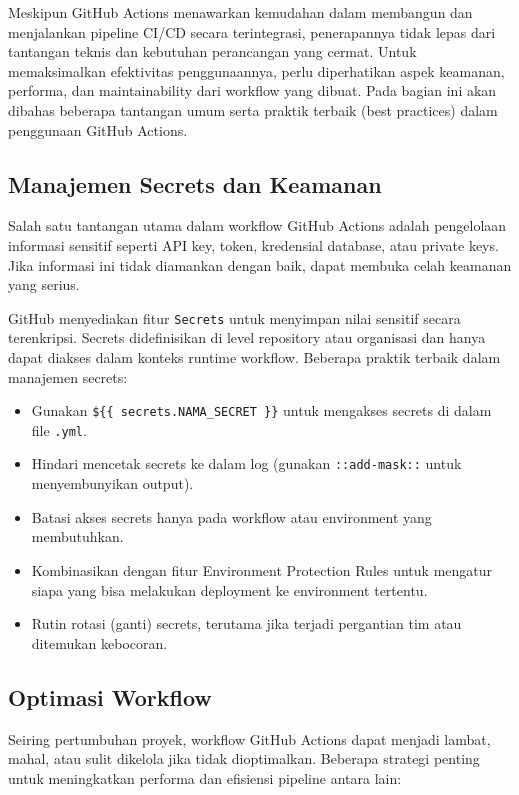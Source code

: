 Meskipun GitHub Actions menawarkan kemudahan dalam membangun dan menjalankan pipeline CI/CD secara terintegrasi, penerapannya tidak lepas dari tantangan teknis dan kebutuhan perancangan yang cermat. Untuk memaksimalkan efektivitas penggunaannya, perlu diperhatikan aspek keamanan, performa, dan maintainability dari workflow yang dibuat. Pada bagian ini akan dibahas beberapa tantangan umum serta praktik terbaik (best practices) dalam penggunaan GitHub Actions.

\subsection{Manajemen Secrets dan Keamanan}

Salah satu tantangan utama dalam workflow GitHub Actions adalah pengelolaan informasi sensitif seperti API key, token, kredensial database, atau private keys. Jika informasi ini tidak diamankan dengan baik, dapat membuka celah keamanan yang serius.

GitHub menyediakan fitur \texttt{Secrets} untuk menyimpan nilai sensitif secara terenkripsi. Secrets didefinisikan di level repository atau organisasi dan hanya dapat diakses dalam konteks runtime workflow. Beberapa praktik terbaik dalam manajemen secrets:

\begin{itemize}
	\item Gunakan \texttt{\$\{\{ secrets.NAMA\_SECRET \}\}} untuk mengakses secrets di dalam file \texttt{.yml}.
	\item Hindari mencetak secrets ke dalam log (gunakan \texttt{::add-mask::} untuk menyembunyikan output).
	\item Batasi akses secrets hanya pada workflow atau environment yang membutuhkan.
	\item Kombinasikan dengan fitur Environment Protection Rules untuk mengatur siapa yang bisa melakukan deployment ke environment tertentu.
	\item Rutin rotasi (ganti) secrets, terutama jika terjadi pergantian tim atau ditemukan kebocoran.
\end{itemize}

\subsection{Optimasi Workflow}

Seiring pertumbuhan proyek, workflow GitHub Actions dapat menjadi lambat, mahal, atau sulit dikelola jika tidak dioptimalkan. Beberapa strategi penting untuk meningkatkan performa dan efisiensi pipeline antara lain:

